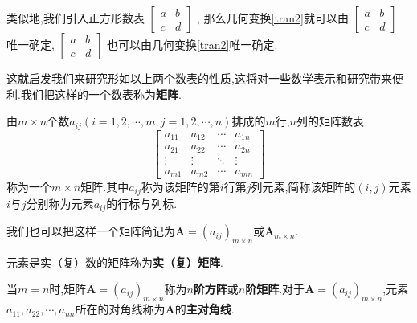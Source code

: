 类似地,我们引入正方形数表
$\begin{bmatrix}
		a & b \\
		c & d
	\end{bmatrix}$	,
那么几何变换\eqref{tran2}就可以由
$\begin{bmatrix}
		a & b \\
		c & d
	\end{bmatrix}$
唯一确定,
$\begin{bmatrix}
		a & b \\
		c & d
	\end{bmatrix}$
也可以由几何变换\eqref{tran2}唯一确定.

这就启发我们来研究形如以上两个数表的性质,这将对一些数学表示和研究带来便利.我们把这样的一个数表称为\textbf{矩阵}.

\begin{definition}[\textbf{矩阵}]
	由$m\times n $个数$a_{ij}\left(i=1,2,\cdots,m; j=1,2,\cdots,n\right)$排成的$m$行,$n$列的矩阵数表
	\[
		\begin{bmatrix}
			a_{11} & a_{12} & \cdots & a_{1n} \\
			a_{21} & a_{22} & \cdots & a_{2n} \\
			\vdots & \vdots & \ddots & \vdots \\
			a_{m1} & a_{m2} & \cdots & a_{mn}
		\end{bmatrix}
	\]
	称为一个$m\times n$矩阵.其中$a_{ij}$称为该矩阵的第$i$行第$j$列元素,简称该矩阵的$\left(i,j\right)$元素$i$与$j$分别称为元素$a_{ij}$的行标与列标.
\end{definition}

我们也可以把这样一个矩阵简记为$\mathbf{A}=\left(a_{ij}\right)_{m\times n}$或$\mathbf{A}_{m\times n}.$

元素是实（复）数的矩阵称为\textbf{实（复）矩阵}.

当$m=n$时,矩阵$\mathbf{A}=\left(a_{ij}\right)_{m\times n}$称为\textbf{$n$阶方阵}或\textbf{$n$阶矩阵}.对于$\mathbf{A}=\left(a_{ij}\right)_{m\times n}$,元素$a_{11},a_{22},\cdots,a_{nn}$所在的对角线称为$\mathbf{A}$的\textbf{主对角线}.

